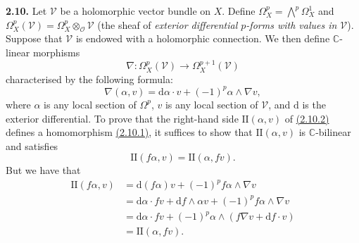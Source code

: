 \documentclass{report}
\newenvironment{rmenv}[1]
  {\phantomsection\par\medskip\noindent\textbf{#1.}\rmfamily}
  {\par\medskip}
\renewcommand{\cal}[1]{{\mathcal{#1}}}
\newcommand{\CC}{\mathbb{C}}
\newcommand{\dd}{\mathrm{d}}
\newcommand{\II}{\mathrm{II}}
\begin{document}
\begin{rmenv}{2.10}
\label{I.2.10}
  Let $\cal{V}$ be a holomorphic vector bundle on $X$.
  Define $\Omega_X^p=\bigwedge^p\Omega_X^1$ and $\Omega_X^p(\cal{V})=\Omega_X^p\otimes_\cal{O}\cal{V}$ (the sheaf of \emph{exterior differential $p$-forms with values in $\cal{V}$}).
  Suppose that $\cal{V}$ is endowed with a holomorphic connection.
  We then define $\CC$-linear morphisms
  \[
  \label{I.2.10.1}
    \nabla\colon \Omega_X^p(\cal{V}) \to \Omega_X^{p+1}(\cal{V})
  \tag{2.10.1}
  \]
  characterised by the following formula:
  \[
  \label{I.2.10.2}
    \nabla(\alpha,v) = \dd\alpha\cdot v + (-1)^p\alpha\wedge\nabla v,
  \tag{2.10.2}
  \]
  where $\alpha$ is any local section of $\Omega^p$, $v$ is any local section of $\cal{V}$, and $\dd$ is the exterior differential.
  To prove that the right-hand side $\II(\alpha,v)$ of \hyperref[I.2.10.2]{(2.10.2)} defines a homomorphism \hyperref[I.2.10.1]{(2.10.1)}, it suffices to show that $\II(\alpha,v)$ is $\CC$-bilinear and satisfies
  \[
    \II(f\alpha,v) = \II(\alpha,fv).
  \]
  But we have that
  \[
    \begin{aligned}
      \II(f\alpha,v)
      &= \dd(f\alpha)v + (-1)^pf\alpha\wedge\nabla v
    \\&= \dd\alpha\cdot fv + \dd f\wedge\alpha v + (-1)^pf\alpha\wedge\nabla v
    \\&= \dd\alpha\cdot fv + (-1)^p\alpha\wedge(f\nabla v+\dd f\cdot v)
    \\&= \II(\alpha,fv).
    \end{aligned}
  \]


\end{rmenv}
\end{document}
